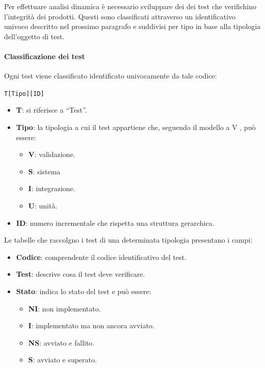 		Per effettuare analisi dinamica è necessario sviluppare dei dei test che verifichino l'integrità dei prodotti. Questi sono classificati attraverso un identificativo univoco descritto nel prossimo paragrafo e suddivisi per tipo in base alla tipologia dell'oggetto di test.

			\paragraph{Classificazione dei test}\label{ClassificazioneTest}
			Ogni test viene classificato identificato univocamente da tale codice:

			\begin{center}
				\texttt{T[Tipo][ID]}
			\end{center}

			\begin{itemize}
				\item \textbf{T}: si riferisce a ``Test''.
				\item \textbf{Tipo}: la tipologia a cui il test appartiene che, seguendo il modello a V%
				, può essere:
				\begin{itemize}
					\item \textbf{V}: validazione.
					\item \textbf{S}: sistema
					\item \textbf{I}: integrazione.
					\item \textbf{U}: unità.
				\end{itemize}
				\item \textbf{ID}: numero incrementale che rispetta una struttura gerarchica.
			\end{itemize}

			\newcommand{\TNI}{{\color{gray}\textbf{NI}}}
			\newcommand{\TI}{{\color{blue}\textbf{I}}}
			\newcommand{\TNS}{{\color{red}\textbf{NS}}}
			\newcommand{\TS}{{\color{green}\textbf{S}}}

			Le tabelle che raccolgno i test di una determinata tipologia presentano i campi:
			\begin{itemize}
				\item \textbf{Codice}: comprendente il codice identificativo del test.
				\item \textbf{Test}: descrive cosa il test deve verificare.
				\item \textbf{Stato}: indica lo stato del test e può essere:
				\begin{itemize}
					\item \TNI: non implementato.
					\item \TI: implementato ma non ancora avviato.
					\item \TNS: avviato e fallito.
					\item \TS: avviato e superato.
				\end{itemize}
			\end{itemize}

